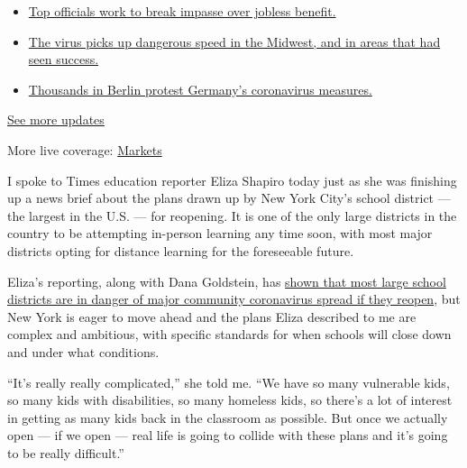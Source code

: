 \begin{itemize}
\tightlist
\item
  \href{https://www.nytimes3xbfgragh.onion/2020/08/01/world/coronavirus-covid-19.html?action=click\&pgtype=Article\&state=default\&region=MAIN_CONTENT_1\&context=storylines_live_updates\#link-3ac56579}{Top
  officials work to break impasse over jobless benefit.}
\item
  \href{https://www.nytimes3xbfgragh.onion/2020/08/01/world/coronavirus-covid-19.html?action=click\&pgtype=Article\&state=default\&region=MAIN_CONTENT_1\&context=storylines_live_updates\#link-8796723}{The
  virus picks up dangerous speed in the Midwest, and in areas that had
  seen success.}
\item
  \href{https://www.nytimes3xbfgragh.onion/2020/08/01/world/coronavirus-covid-19.html?action=click\&pgtype=Article\&state=default\&region=MAIN_CONTENT_1\&context=storylines_live_updates\#link-25930521}{Thousands
  in Berlin protest Germany's coronavirus measures.}
\end{itemize}

\href{https://www.nytimes3xbfgragh.onion/2020/08/01/world/coronavirus-covid-19.html?action=click\&pgtype=Article\&state=default\&region=MAIN_CONTENT_1\&context=storylines_live_updates}{See
more updates}

More live coverage:
\href{https://www.nytimes3xbfgragh.onion/live/2020/07/31/business/stock-market-today-coronavirus?action=click\&pgtype=Article\&state=default\&region=MAIN_CONTENT_1\&context=storylines_live_updates}{Markets}

I spoke to Times education reporter Eliza Shapiro today just as she was
finishing up a news brief about the plans drawn up by New York City's
school district --- the largest in the U.S. --- for reopening. It is one
of the only large districts in the country to be attempting in-person
learning any time soon, with most major districts opting for distance
learning for the foreseeable future.

Eliza's reporting, along with Dana Goldstein, has
\href{https://www.nytimes3xbfgragh.onion/2020/07/14/us/coronavirus-schools-fall.html}{shown
that most large school districts are in danger of major community
coronavirus spread if they reopen}, but New York is eager to move ahead
and the plans Eliza described to me are complex and ambitious, with
specific standards for when schools will close down and under what
conditions.

``It's really really complicated,'' she told me. ``We have so many
vulnerable kids, so many kids with disabilities, so many homeless kids,
so there's a lot of interest in getting as many kids back in the
classroom as possible. But once we actually open --- if we open --- real
life is going to collide with these plans and it's going to be really
difficult.''

